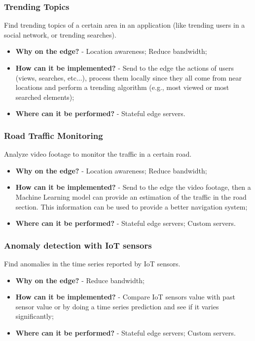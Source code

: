 \subsubsection{Trending Topics}
Find trending topics of a certain area in an application (like trending users in a social network, or trending searches).
\begin{itemize}
    \item \textbf{Why on the edge?} - Location awareness; Reduce bandwidth;
    \item \textbf{How can it be implemented?} - Send to the edge the actions of users (views, searches, etc...), process them locally since they all come from near locations and perform a trending algorithm (e.g., most viewed or most searched elements);
    \item \textbf{Where can it be performed?} - Stateful edge servers.
\end{itemize}


\subsubsection{Road Traffic Monitoring}
Analyze video footage to monitor the traffic in a certain road.
\begin{itemize}
    \item \textbf{Why on the edge?} - Location awareness; Reduce bandwidth;
    \item \textbf{How can it be implemented?} - Send to the edge the video footage, then a Machine Learning model can provide an estimation of the traffic in the road section. This information can be used to provide a better navigation system;
    \item \textbf{Where can it be performed?} - Stateful edge servers; Custom servers.
\end{itemize}


\subsubsection{Anomaly detection with IoT sensors}
Find anomalies in the time series reported by IoT sensors.
\begin{itemize}
    \item \textbf{Why on the edge?} - Reduce bandwidth;
    \item \textbf{How can it be implemented?} - Compare IoT sensors value with past sensor value or by doing a time series prediction and see if it varies significantly;
    \item \textbf{Where can it be performed?} - Stateful edge servers; Custom servers.
\end{itemize}


